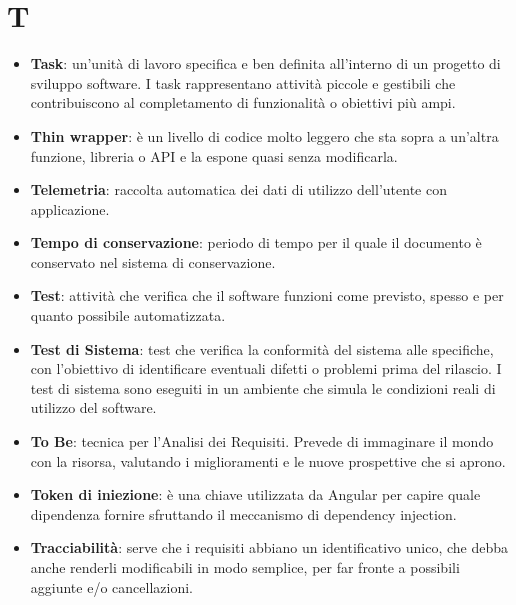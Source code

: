 \documentclass[a4paper,12pt]{article}
\begin{document}
\section{T}
\begin{itemize}
    \item \textbf{Task}: un'unità di lavoro specifica e ben definita all'interno di un progetto di sviluppo software. I task rappresentano attività piccole e gestibili che contribuiscono al completamento di funzionalità o obiettivi più ampi.
    \item \textbf{Thin wrapper}: è un livello di codice molto leggero che sta sopra a un’altra funzione, libreria o API e la espone quasi senza modificarla.
    \item \textbf{Telemetria}: raccolta automatica dei dati di utilizzo dell'utente con applicazione.
    \item \textbf{Tempo di conservazione}: periodo di tempo per il quale il documento è conservato nel sistema di conservazione.
    \item \textbf{Test}: attività che verifica che il software funzioni come previsto, spesso e per quanto possibile automatizzata.
    \item \textbf{Test di Sistema}: test che verifica la conformità del sistema alle specifiche, con l'obiettivo di identificare eventuali difetti o problemi prima del rilascio. I test di sistema sono eseguiti in un ambiente che simula le condizioni reali di utilizzo del software.
    \item \textbf{To Be}: tecnica per l'Analisi dei Requisiti. Prevede di immaginare il mondo con la risorsa, valutando i miglioramenti e le nuove prospettive che si aprono.
    \item \textbf{Token di iniezione}: è una chiave utilizzata da Angular per capire quale dipendenza fornire sfruttando il meccanismo di dependency injection.
    \item \textbf{Tracciabilità}: serve che i requisiti abbiano un identificativo unico, che debba anche renderli modificabili in modo semplice, per far fronte a possibili aggiunte e/o cancellazioni.
\end{itemize}
\end{document}

